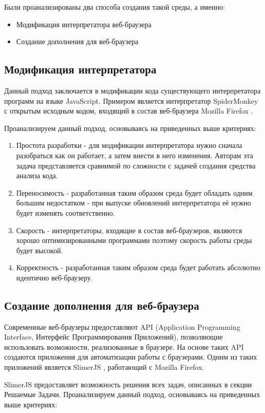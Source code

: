 	Были проанализированы два способа создания такой среды, а именно:
	\begin{itemize}
		\item Модификация интерпретатора веб-браузера
		\item Создание дополнения для веб-браузера
	\end{itemize}

\subsection{Модификация интерпретатора}
	Данный подход заключается в модификации кода существующего интерпретатора программ на языке JavaScript. Примером является интерпретатор SpiderMonkey \cite{spidermonkey} с открытым исходным кодом, входящий в состав веб-браузера Mozilla Firefox \cite{mozilla}. 

	Проанализируем данный подход, основываясь на приведенных выше критериях:
	\begin{enumerate}
		\item Простота разработки - для модификации интерпретатора нужно сначала разобраться как он работает, а затем внести в него изменения. Авторам эта задача представляется сравнимой по сложности с задачей создания средства анализа кода.
		\item Переносимость - разработанная таким образом среда будет обладать одним большим недостатком - при выпуске обновлений интерпретатора её нужно будет изменять соответственно.
		\item Скорость - интерпретаторы, входящие в состав веб-браузеров, являются хорошо оптимизированными программами поэтому скорость работы среды будет высокой.
		\item Корректность - разработанная таким образом среда будет работать абсолютно идентично веб-браузеру.
	\end{enumerate}

\subsection{Создание дополнения для веб-браузера}
	Современные веб-браузеры предоставляют API (Application Programming Interface, Интерфейс Программирования Приложений), позволяющие использовать возможности, реализованные в браузере. На основе таких API создаются приложения для автоматизации работы с браузерами. Одним из таких приложений является SlimerJS \cite{slimer}, работающий с Mozilla Firefox. 


	SlimerJS предоставляет возможность решения всех задач, описанных в секции Решаемые Задачи. Проанализируем данный подход, основываясь на приведенных выше критериях:

